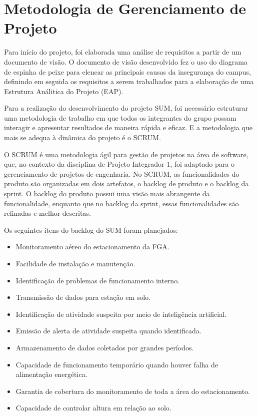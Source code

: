 \section{Metodologia de Gerenciamento de Projeto} %

  Para início do projeto, foi elaborada uma análise de requisitos a partir de um documento de visão. O documento de visão desenvolvido fez o uso do diagrama de espinha de peixe para elencar as principais causas da insegurança do campus, definindo em seguida os requisitos a serem trabalhados para a elaboração de uma Estrutura Análitica do Projeto (EAP).

  Para a realização do desenvolvimento do projeto SUM, foi necessário estruturar uma metodologia de trabalho em que todos os integrantes do grupo possam interagir e apresentar resultados de maneira rápida e eficaz. E a metodologia que mais se adequa à dinâmica do projeto é o SCRUM.

  O SCRUM é uma metodologia ágil para gestão de projetos na área de software, que, no contexto da disciplina de Projeto Integrador 1, foi adaptado para o gerenciamento de projetos de engenharia.
  No SCRUM, as funcionalidades do produto são organizadas em dois artefatos, o backlog de produto e o backlog da sprint. O backlog do produto possui uma visão mais abrangente da funcionalidade, enquanto que no backlog da sprint, essas funcionalidades são refinadas e melhor descritas.

  Os seguintes itens do backlog do SUM foram planejados:

  \begin{itemize}
    \item Monitoramento aéreo do estacionamento da FGA.
    \item Facilidade de instalação e manutenção.
    \item Identificação de problemas de funcionamento interno.
    \item Transmissão de dados para estação em solo.
    \item Identificação de atividade suspeita por meio de inteligência artificial.
    \item Emissão de alerta de atividade suspeita quando identificada.
    \item Armazenamento de dados coletados por grandes períodos.
    \item Capacidade de funcionamento temporário quando houver falha de alimentação  energética.
    \item Garantia de cobertura do monitoramento de toda a área do estacionamento.
    \item Capacidade de controlar altura em relação ao solo.
\end{itemize}

